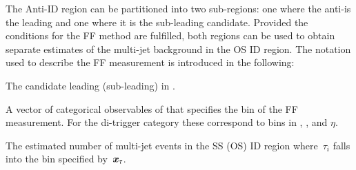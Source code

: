 {%
  \newcommand*{\ffargs}{\ensuremath{( \myvec{x}_{\tau} )}\xspace}

  \newcommand*{\NmjID}[2]{\ensuremath{N_\text{multi-jet}^{\text{#1, loose }\tau_{#2}}}\xspace}
  \newcommand*{\NmjIDIncl}[1]{\ensuremath{N_\text{multi-jet}^{\text{#1, ID}}}\xspace}

  \newcommand*{\NmjAntiIDIncl}[1]{\ensuremath{N_\text{multi-jet}^{\text{#1, Anti-ID}}}\xspace}
  \newcommand*{\NmjAntiID}[2]{\ensuremath{N_\text{multi-jet}^{\text{#1, anti-}\tau_{#2}}}\xspace}

  The Anti-ID region can be partitioned into two sub-regions: one where the
  anti-\tauhadvis is the leading and one where it is the sub-leading \tauhadvis
  candidate. Provided the conditions for the FF method are fulfilled, both
  regions can be used to obtain separate estimates of the multi-jet background
  in the OS ID region. The notation used to describe the FF measurement is
  introduced in the following:
  \begin{description}[style=standard]
  \item[$\tau_0$ ($\tau_1$)] The \tauhadvis candidate leading (sub-leading) in \pT.

  \item[$\myvec{x}_\tau$] A vector of categorical observables of \tauhadvis that
    specifies the bin of the FF measurement. For the di-\tauhadvis trigger
    category these correspond to bins in \Ntracks, \pT, and $\eta$.

  \item[$\NmjID{SS(OS)}{i}\ffargs$] The estimated number of multi-jet
    events in the SS (OS) ID region where~$\tau_i$ falls into the bin
    specified by~$\myvec{x}_\tau$.


\end{description}}
